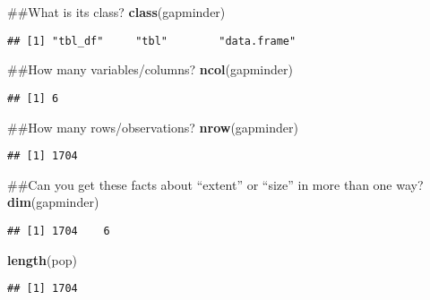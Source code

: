 \documentclass[]{article}
\newenvironment{Shaded}{\begin{snugshade}}{\end{snugshade}}
\newcommand{\KeywordTok}[1]{\textcolor[rgb]{0.13,0.29,0.53}{\textbf{#1}}}
\newcommand{\NormalTok}[1]{#1}
\begin{document}
\begin{Shaded}
\begin{Highlighting}[]
\NormalTok{##What is its class?}
\KeywordTok{class}\NormalTok{(gapminder)}
\end{Highlighting}
\end{Shaded}

\begin{verbatim}
## [1] "tbl_df"     "tbl"        "data.frame"
\end{verbatim}

\begin{Shaded}
\begin{Highlighting}[]
\NormalTok{##How many variables/columns?}
\KeywordTok{ncol}\NormalTok{(gapminder)}
\end{Highlighting}
\end{Shaded}

\begin{verbatim}
## [1] 6
\end{verbatim}

\begin{Shaded}
\begin{Highlighting}[]
\NormalTok{##How many rows/observations?}
\KeywordTok{nrow}\NormalTok{(gapminder)}
\end{Highlighting}
\end{Shaded}

\begin{verbatim}
## [1] 1704
\end{verbatim}

\begin{Shaded}
\begin{Highlighting}[]
\NormalTok{##Can you get these facts about “extent” or “size” in more than one way? }
\KeywordTok{dim}\NormalTok{(gapminder)}
\end{Highlighting}
\end{Shaded}

\begin{verbatim}
## [1] 1704    6
\end{verbatim}

\begin{Shaded}
\begin{Highlighting}[]
\KeywordTok{length}\NormalTok{(pop)}
\end{Highlighting}
\end{Shaded}

\begin{verbatim}
## [1] 1704
\end{verbatim}
\end{document}
